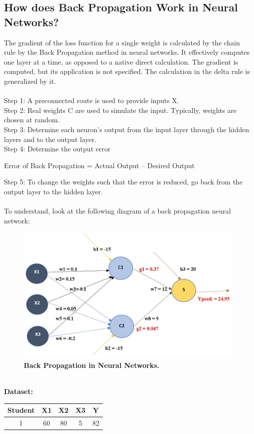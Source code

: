 \documentclass{article}
\begin{document}
\subsection{How does Back Propagation Work in Neural Networks?}
The gradient of the loss function for a single weight is calculated by the chain rule by the Back Propagation method in neural networks. It effectively computes one layer at a time, as opposed to a native direct calculation. The gradient is computed, but its application is not specified. The calculation in the delta rule is generalized by it.\\\\
Step 1: A preconnected route is used to provide inputs X.\\
Step 2: Real weights C are used to simulate the input. Typically, weights are chosen at random.\\
Step 3: Determine each neuron's output from the input layer through the hidden layers and to the output layer.\\
Step 4: Determine the output error
\begin{center}
Error of Back Propagation = Actual Output – Desired Output
\end{center}
Step 5: To change the weights such that the error is reduced, go back from the output layer to the hidden layer.\\\\
To understand, look at the following diagram of a back propagation neural network:
\begin{figure}[!htb]
    \centering
    \includegraphics[width=0.85\linewidth]{Back Propagation_Examples.JPG}
    \caption{\textbf{Back Propagation in Neural Networks.}}
    \label{fig:P1Q3b}
\end{figure}
\\\textbf{Dataset:}
\begin{center}
\begin{tabular}{||c c c c c||} 
 \hline
 Student & X1 & X2 & X3 & Y \\ [0.5ex] 
 \hline\hline
 1 & 60 & 80 & 5 & 82 \\ 
 \hline
\end{tabular}
\end{center}
\end{document}
